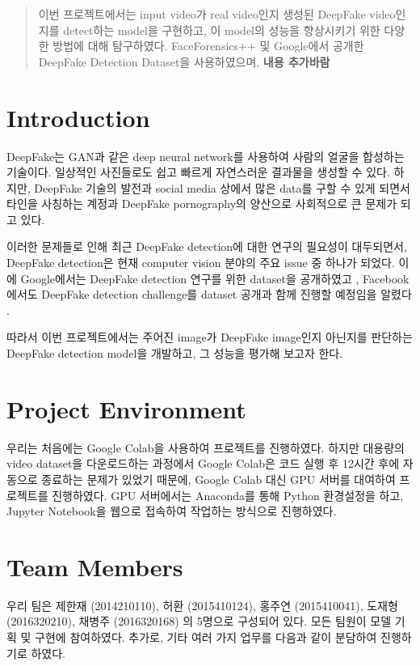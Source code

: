 \documentclass{article}
\begin{document}
	\begin{abstract}
		이번 프로젝트에서는 input video가 real video인지 생성된 DeepFake video인지를 detect하는 model을 구현하고, 이 model의 성능을 향상시키기 위한 다양한 방법에 대해 탐구하였다. FaceForensics++ 및 Google에서 공개한 DeepFake Detection Dataset을 사용하였으며, \textbf{내용 추가바람}
	\end{abstract}
	
	\section{Introduction}
	DeepFake는 GAN과 같은 deep neural network를 사용하여 사람의 얼굴을 합성하는 기술이다. 일상적인 사진들로도 쉽고 빠르게 자연스러운 결과물을 생성할 수 있다. 하지만, DeepFake 기술의 발전과 social media 상에서 많은 data를 구할 수 있게 되면서 타인을 사칭하는 계정과 DeepFake pornography의 양산으로 사회적으로 큰 문제가 되고 있다.
	
	이러한 문제들로 인해 최근 DeepFake detection에 대한 연구의 필요성이 대두되면서, DeepFake detection은 현재 computer vision 분야의 주요 issue 중 하나가 되었다. 이에 Google에서는 DeepFake detection 연구를 위한 dataset을 공개하였고 \cite{googleblog}, Facebook에서도 DeepFake detection challenge를 dataset 공개과 함께 진행할 예정임을 알렸다 \cite{facebookblog}.
	
	따라서 이번 프로젝트에서는 주어진 image가 DeepFake image인지 아닌지를 판단하는 DeepFake detection model을 개발하고, 그 성능을 평가해 보고자 한다.
	
	\section{Project Environment}
	
	우리는 처음에는 Google Colab을 사용하여 프로젝트를 진행하였다. 하지만 대용량의 video dataset을 다운로드하는 과정에서 Google Colab은 코드 실행 후 12시간 후에 자동으로 종료하는 문제가 있었기 때문에, Google Colab 대신 GPU 서버를 대여하여 프로젝트를 진행하였다. GPU 서버에서는 Anaconda를 통해 Python 환경설정을 하고, Jupyter Notebook을 웹으로 접속하여 작업하는 방식으로 진행하였다.
	
	\section{Team Members}
	우리 팀은 제한재 (2014210110), 허환 (2015410124), 홍주연 (2015410041), 도재형 (2016320210), 채병주 (2016320168) 의 5명으로 구성되어 있다.
	모든 팀원이 모델 기획 및 구현에 참여하였다. 추가로, 기타 여러 가지 업무를 다음과 같이 분담하여 진행하기로 하였다.
	
\end{document}
